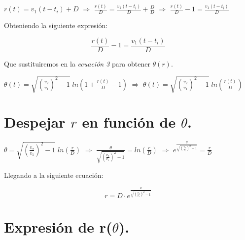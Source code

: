 \documentclass[a4paper,12pt]{article} %
\begin{document}
\vspace{\baselineskip}

\(r\left(t\right)=v_1\left(t-t_i\right)+D\)  \( \Rightarrow \) \( \frac{r(t)}{D} = \frac{v_1\left(t-t_i\right)}{D} + \frac{D}{D} \) \( \Rightarrow \) \(\frac{r(t)}{D} - 1 = \frac{v_1\left(t-t_i\right)}{D} \)

\vspace{\baselineskip}

\begin{justify}
Obteniendo la siguiente expresión:

\[
\boxed{\frac{r(t)}{D} - 1 = \frac{v_1\left(t-t_i\right)}{D}}
\]
\end{justify}

\vspace{\baselineskip}
\begin{justify}
Que sustituiremos en la \textit{ecuación 3} para obtener \(\theta(r)\).
\end{justify}

\vspace{\baselineskip}

\(\theta\left(t\right)=\sqrt{\left(\frac{v_2}{v_1}\right)^2 -1} \; ln\left(1+\frac{r(t)}{D} - 1\right)\) \(\Rightarrow\) \(\theta\left(t\right)=\sqrt{\left(\frac{v_2}{v_1}\right)^2 -1} \; ln\left(\frac{r(t)}{D}\right)\)

\vspace{\baselineskip}

\section{Despejar \( r \) en función de \(\theta\).}

\vspace{\baselineskip}
\(\theta=\sqrt{\left(\frac{v_2}{v_1}\right)^2 -1} \; ln\left(\frac{r}{D}\right)\) \(\Rightarrow\) \(\frac{\theta}{\sqrt{\left(\frac{v_2}{v_1}\right)^2 -1}} = ln\left(\frac{r}{D}\right) \) \( \Rightarrow \) \(e^{\frac{\theta}{\sqrt{\left(\frac{v_2}{v_1}\right)^2 -1}}} = \frac{r}{D} \)

\vspace{\baselineskip}

\begin{justify}
    Llegando a la siguiente ecuación:
\end{justify}

\[
\boxed{r = D \cdot e^{\frac{\theta}{\sqrt{\left(\frac{v_2}{v_1}\right)^2 -1}}} }
\]


\section{Expresión de r(\(\theta\)). }
\end{document}
